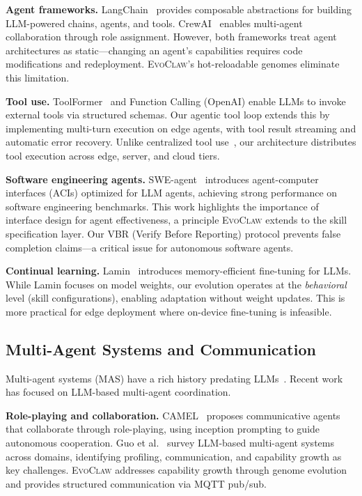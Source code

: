 \documentclass{article}
\newcommand{\evoclaw}{\textsc{EvoClaw}}
\begin{document}
\textbf{Agent frameworks.} LangChain~\cite{langchain} provides composable abstractions for building LLM-powered chains, agents, and tools. CrewAI~\cite{crewai} enables multi-agent collaboration through role assignment. However, both frameworks treat agent architectures as static---changing an agent's capabilities requires code modifications and redeployment. \evoclaw{}'s hot-reloadable genomes eliminate this limitation.

\textbf{Tool use.} ToolFormer~\cite{schick2023toolformer} and Function Calling (OpenAI) enable LLMs to invoke external tools via structured schemas. Our agentic tool loop extends this by implementing multi-turn execution on edge agents, with tool result streaming and automatic error recovery. Unlike centralized tool use~\cite{parisi2023gorilla}, our architecture distributes tool execution across edge, server, and cloud tiers.

\textbf{Software engineering agents.} SWE-agent~\cite{yang2024sweagent} introduces agent-computer interfaces (ACIs) optimized for LLM agents, achieving strong performance on software engineering benchmarks. This work highlights the importance of interface design for agent effectiveness, a principle \evoclaw{} extends to the skill specification layer. Our VBR (Verify Before Reporting) protocol prevents false completion claims---a critical issue for autonomous software agents.

\textbf{Continual learning.} Lamin~\cite{lamar2023lamin} introduces memory-efficient fine-tuning for LLMs. While Lamin focuses on model weights, our evolution operates at the \textit{behavioral} level (skill configurations), enabling adaptation without weight updates. This is more practical for edge deployment where on-device fine-tuning is infeasible.

\subsection{Multi-Agent Systems and Communication}

Multi-agent systems (MAS) have a rich history predating LLMs~\cite{wooldridge2009introduction}. Recent work has focused on LLM-based multi-agent coordination.

\textbf{Role-playing and collaboration.} CAMEL~\cite{li2023camel} proposes communicative agents that collaborate through role-playing, using inception prompting to guide autonomous cooperation. Guo et al.~\cite{guo2024llm_multi_agents} survey LLM-based multi-agent systems across domains, identifying profiling, communication, and capability growth as key challenges. \evoclaw{} addresses capability growth through genome evolution and provides structured communication via MQTT pub/sub.
\end{document}
